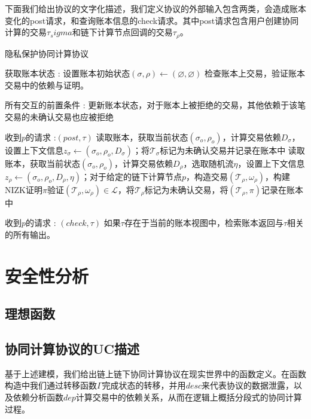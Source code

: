 下面我们给出协议的文字化描述，我们定义协议的外部输入包含两类，会造成账本变化的post请求，和查询账本信息的check请求。其中post请求包含用户创建协同计算的交易$\tau_sigma$和链下计算节点回调的交易$\tau_\rho$。
\begin{breakablealgorithm}
    \caption{隐私保护协同计算协议}
    \label{alg:ch4-4}
    \begin{algorithmic} 
        \item[获取账本状态]: 
        \STATE 设置账本初始状态$(\sigma, \rho) \leftarrow (\varnothing, \varnothing)$
        检查账本上交易，验证账本交易中的依赖与证明。

        \item[所有交互的前置条件]: 更新账本状态，对于账本上被拒绝的交易，其他依赖于该笔交易的未确认交易也应被拒绝
        \item[收到$p$的请求]:$(post, \tau)$
        \STATE 读取账本，获取当前状态$(\sigma_o, \rho_o)$，计算交易依赖$D_\sigma$，设置上下文信息$z_\sigma \leftarrow (\sigma_o, \rho_o, D_\sigma)$；将$\mathcal{T}_\sigma$标记为未确认交易并记录在账本中
        \STATE 读取账本，获取当前状态$(\sigma_o, \rho_o)$，计算交易依赖$D_\rho$，选取随机流$\eta$，设置上下文信息$z_\rho \leftarrow (\sigma_o, \rho_o, D_\rho, \eta)$；对于给定的链下计算节点$\mathit{p}$，构造交易$(\mathcal{T}_\rho, \omega_\rho)$，构建NIZK证明$\pi$验证$(\mathcal{T}_\rho, \omega_\rho) \in \mathcal{L}$，将$\mathcal{T}_\rho$标记为未确认交易，将$(\mathcal{T}_\rho, \pi)$记录在账本中

        \item[收到$p$的请求]: $(check, \tau)$  
        \STATE 如果$\tau$存在于当前的账本视图中，检索账本返回与$\tau$相关的所有输出。
    \end{algorithmic}
\end{breakablealgorithm}

\section{安全性分析}
\subsection{理想函数}

\subsection{协同计算协议的UC描述}
基于上述建模，我们给出链上链下协同计算协议在现实世界中的函数定义。在函数构造中我们通过转移函数$\Gamma$完成状态的转移，并用$desc$来代表协议的数据泄露，以及依赖分析函数$dep$计算交易中的依赖关系，从而在逻辑上概括分段式的协同计算过程。

